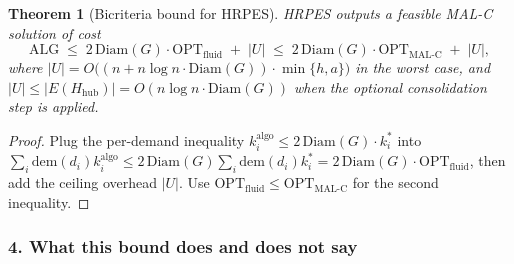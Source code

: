 \documentclass[12pt, a4paper]{article}
\newtheorem{theorem}{Theorem}
\begin{document}
\begin{theorem}[Bicriteria bound for HRPES]
\label{thm:main}
HRPES outputs a feasible MAL-C solution of cost
\[
\mathrm{ALG} \;\le\; 2\,\mathrm{Diam}(G)\cdot \mathrm{OPT}_\mathrm{fluid} \;+\; |U|
\;\le\; 2\,\mathrm{Diam}(G)\cdot \mathrm{OPT}_\mathrm{MAL\text{-}C} \;+\; |U|,
\]
where $|U|=O\bigl((n+n\log n\cdot\mathrm{Diam}(G))\cdot\min\{h,a\}\bigr)$ in the worst case, and $|U|\le|E(H_\mathrm{hub})|=O(n\log n\cdot\mathrm{Diam}(G))$ when the optional consolidation step is applied.
\end{theorem}
\begin{proof}
Plug the per-demand inequality $k_i^{\mathrm{algo}}\le 2\,\mathrm{Diam}(G)\cdot k_i^*$ into $\sum_i\mathrm{dem}(d_i)k_i^{\mathrm{algo}}\le 2\,\mathrm{Diam}(G)\sum_i\mathrm{dem}(d_i)k_i^*=2\,\mathrm{Diam}(G)\cdot\mathrm{OPT}_\mathrm{fluid}$, then add the ceiling overhead $|U|$. Use $\mathrm{OPT}_\mathrm{fluid}\le\mathrm{OPT}_\mathrm{MAL\text{-}C}$ for the second inequality.
\end{proof}

\subsubsection*{4. What this bound does and does not say}
\end{document}

